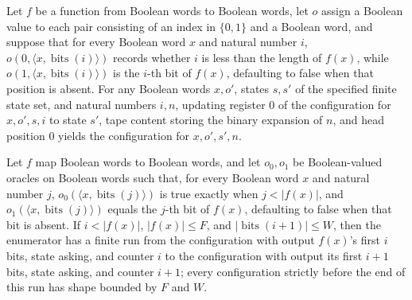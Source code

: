 \begin{lemma}
\label{Complexity.ImplicitEnum.regCfg_cfg}
\leanok
{}
Let $f$ be a function from Boolean words to Boolean words, let $o$ assign a Boolean
value to each pair consisting of an index in $\{0,1\}$ and a Boolean word, and suppose
that for every Boolean word $x$ and natural number $i$, $o(0,\langle
x,\operatorname{bits}(i)\rangle)$ records whether $i$ is less than the length of $f(x)$,
while $o(1,\langle x,\operatorname{bits}(i)\rangle)$ is the $i$-th bit of $f(x)$,
defaulting to false when that position is absent. For any Boolean words $x,o'$, states
$s,s'$ of the specified finite state set, and natural numbers $i,n$, updating register
$0$ of the configuration for $x,o',s,i$ to state $s'$, tape content storing the binary
expansion of $n$, and head position $0$ yields the configuration for $x,o',s',n$.
\end{lemma}

\begin{lemma}
\label{Complexity.ImplicitEnum.round}
\leanok
{}
Let $f$ map Boolean words to Boolean words, and let $o_0,o_1$ be Boolean-valued oracles
on Boolean words such that, for every Boolean word $x$ and natural number $j$,
$o_0(\langle x,\operatorname{bits}(j)\rangle)$ is true exactly when $j<|f(x)|$, and
$o_1(\langle x,\operatorname{bits}(j)\rangle)$ equals the $j$-th bit of $f(x)$,
defaulting to false when that bit is absent. If $i<|f(x)|$, $|f(x)|\le F$, and
$|\operatorname{bits}(i+1)|\le W$, then the enumerator has a finite run from the
configuration with output $f(x)$'s first $i$ bits, state asking, and counter $i$ to the
configuration with output its first $i+1$ bits, state asking, and counter $i+1$; every
configuration strictly before the end of this run has shape bounded by $F$ and $W$.
\end{lemma}

